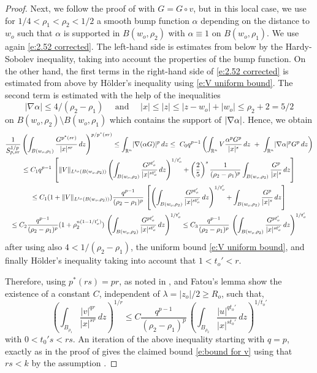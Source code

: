 \documentclass[10pt]{amsart}
\begin{document}
\begin{proof}
Next, we follow the proof of \cite[Theorem 2.1b]{V11} with $G=G\circ v$, but in this local case, we use for $1/4<\rho_1<\rho_2<1/2$ a smooth bump function $\alpha$ depending on the distance to $w_o$ such that $\alpha$ is supported in $B(w_o,\rho_2)$ with $\alpha\equiv 1$ on $B(w_o,\rho_1)$. We use again  \eqref{e:2.52 corrected}. The left-hand side is estimates from below  by the Hardy-Sobolev inequality, taking into account the properties of the bump function. 
On the other hand, the first terms in the right-hand side of \eqref{e:2.52 corrected} is estimated from above by H\"older's inequality using \eqref{e:V uniform bound}. The second term is estimated with the help of  the inequalities
$$|\nabla \alpha|\leq 4/(\rho_2-\rho_1)\quad\text{ and }\quad |x|\leq |z|\leq |z-w_o|+|w_o|\leq \rho_2+2=5/2$$
on $B(w_o,\rho_2)\setminus B(w_o,\rho_1)$ which contains the support of $\lvert \nabla \alpha \rvert$. Hence, we obtain
\begin{multline*}
\frac {1}{S^{1/p}_{p,sr}} \left( \int_{B(w_o,\rho_1)}\frac {G^{p^*(s r)}}{|x|^{sr}}\,dz \right)^{p/{p^*(sr)}}
\leq \int_{\mathbb{R}^n} \lvert \nabla(\alpha G) \rvert^p\, dz \leq\ C_0q^{p-1}\left (\int_{\mathbb{R}^n} V\frac
{\alpha^pG^p}{|x|^s}\,dz \ +\  \int_{\mathbb{R}^n} \lvert \nabla \alpha \rvert^p
G^p\, dz\right )\\
\leq  C_1  {q^{p-1}}\,\left [\lVert V\rVert_{L^{t_o}(B(w_o,\rho_2))} \left( \int_{B(w_o,\rho_2)}\frac {G^{p t_o'}}{|x|^{st_o'}}\,dz \right)^{1/{t_o'}} +\left(\frac 25\right)^s \frac {1}{(\rho_2-\rho_1)^p} \int_{B(w_o,\rho_2)}\frac {G^p}{|x|^s}\,dz \right]\\
\leq  C_1(1+\lVert V\rVert_{L^{t_o}(B(w_o,\rho_2))}) \frac {q^{p-1}}{(\rho_2-\rho_1)^p}\,\left [ \left( \int_{B(w_o,\rho_2)}\frac {G^{p t_o'}}{|x|^{st_o'}}\,dz \right)^{1/{t_o'}} +\int_{B(w_o,\rho_2)}\frac {G^p}{|x|^s}\,dz \right]\\
\leq  C_2 \frac {q^{p-1}}{(\rho_2-\rho_1)^p}(1+\rho_2^{n(1-1/t_o')})\,\left( \int_{B(w_o,\rho_2)}\frac {G^{p t_o'}}{|x|^{st_o'}}\,dz \right)^{1/{t_o'}}
\leq C_3 \frac {q^{p-1}}{(\rho_2-\rho_1)^p}\,\left( \int_{B(w_o,\rho_2)}\frac {G^{p t_o'}}{|x|^{st_o'}}\,dz \right)^{1/{t_o'}}
\end{multline*}
after using  also  $4<1/(\rho_2-\rho_1)$, the uniform bound \eqref{e:V uniform bound},  and finally H\"older's inequality taking into account  that $1<t_o'<r$.



 Therefore, using $p^*(rs)=pr$, as noted in \cite[(2.3)]{V11}, and Fatou's lemma show the  existence of a constant $C$, independent of $\lambda=|z_o|/2\geq R_o$, such that,
\begin{equation}\label{e:moser iterate}
\left( \int_{B_{\rho_1}}\frac {|v|^{ qr}}{|x|^{sr}}\,dz \right)^{1/r}
\leq  C \frac {q^{p-1}}{(\rho_2-\rho_1)^p} \,
\left( \int_{B_{\rho_2}}\frac {|u|^{q t_o'}}{|x|^{st_o'}}\,dz \right)^{1/{t_o'}}
\end{equation}
with $0<t_0's<rs$.
An iteration of the above inequality starting with $q=p$, exactly as in the proof of \cite[Theorem 2.1b]{V11} gives the claimed bound \eqref{e:bound for v} using that $rs<k$ by the assumption \cite[(2.4)]{V11}.


\end{proof}
\end{document}
